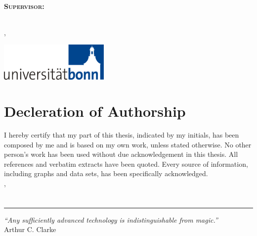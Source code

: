 \begin{titlepage}
	\centering
	
	\Large\scshape
	\infoInstitute\\
	\infoDepartment
	\vspace{0.17\textheight}\\
	
	\Huge\normalfont
	\infoTitleHead
	\vspace{0.3\baselineskip}\\
	\huge\bfseries
	\infoTitle
	\vspace{0.12\textheight}\\
	
	\Large
	\infoThesisType\\[0.3\baselineskip]
	\normalfont\large
	Supervisor:	\infoAdvisor
	\vspace{4\baselineskip}\\
	
	\Large
	\infoAuthorB
	
	\infoAuthorM
	\vspace{4\baselineskip}\\
	\infoLocation, \infoDate
	\vfill
	
	\includegraphics[width=0.4\textwidth]{images/uni_bonn_logo}
	
\end{titlepage}
\restoregeometry


\chapter*{Decleration of Authorship}

I hereby certify that my part of this thesis, indicated by my initials, has been composed by me and is based on my own work, unless stated otherwise.
No other person's work has been used without due acknowledgement in this thesis.
All references and verbatim extracts have been quoted.
Every source of information, including graphs and data sets, has been specifically acknowledged.
\vspace{4\baselineskip}\\
\infoLocation, \infoDate \hfill \infoAuthor
\vspace{4\baselineskip}\\

\chapter*{}
\vfill
\rule{\textwidth}{0.4pt}
\emph{``Any sufficiently advanced technology is indistinguishable from magic.''}\\ Arthur C. Clarke